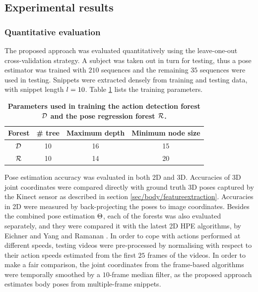 \subsection{Experimental results}
\subsubsection{Quantitative evaluation}
\label{sec/body/quant}
The proposed approach was evaluated quantitatively using the leave-one-out cross-validation strategy. A subject was taken out in turn for testing, thus a pose estimator was trained with $210$ sequences and the remaining $35$ sequences were used in testing. 
Snippets were extracted densely from training and testing data, with snippet length $l = 10$. Table \ref{tab/body/rf_train_params} lists the training parameters. 

\begin{table}[ht]
	\centering
	\begin{tabular}{|c|c|c|c|}
		\hline 
		\textbf{Forest} & \textbf{\# tree} & \textbf{Maximum depth} & \textbf{Minimum node size} \\ \hline 
		$\mathcal{D}$ & 10 & 16 & 15 \\ \hline 
		$\mathcal{R}$ & 10 & 14 & 20 \\ \hline 
	\end{tabular} 
	\caption{\textbf{Parameters used in training the action detection forest $\mathcal{D}$ and the pose regression forest $\mathcal{R}$.}}
	\label{tab/body/rf_train_params}
\end{table}


Pose estimation accuracy was evaluated in both 2D and 3D. Accuracies of 3D joint coordinates were compared directly with ground truth 3D poses captured by the Kinect sensor as described in section \ref{sec/body/featureextraction}. Accuracies in 2D were measured by back-projecting the poses to image coordinates.  
Besides the combined pose estimation $\Theta$, each of the forests was also evaluated separately, and they were compared it with the latest 2D HPE algorithms, by Eichner \etal \cite{Eichner2012} and Yang and Ramanan \cite{Yang2011}. 
In order to cope with actions performed at different speeds, testing videos were pre-processed by normalising with respect to their action speeds estimated from the first $25$ frames of the videos.
In order to make a fair comparison, the joint coordinates from the frame-based algorithms were temporally smoothed by a $10$-frame median filter, as the proposed approach estimates body poses from multiple-frame snippets. 

